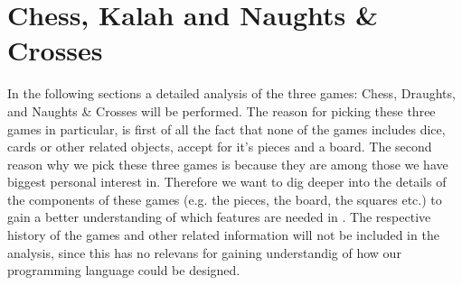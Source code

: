 \section{Chess, Kalah and Naughts \& Crosses}

In the following sections a detailed analysis of the three games: Chess, Draughts, and Naughts \& Crosses will be performed. The reason for picking these three games in particular, is first of all the fact that none of the games includes dice, cards or other related objects, accept for it's pieces and a board. The second reason why we pick these three games is because they are among those we have biggest personal interest in. Therefore we want to dig deeper into the details of the components of these games (e.g. the pieces, the board, the squares etc.) to gain a better understanding of which features are needed in \productname. The respective history of the games and other related information will not be included in the analysis, since this has no relevans for gaining understandig of how our programming language could be designed.  




      
